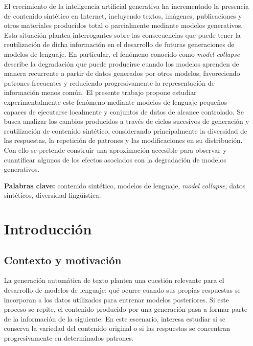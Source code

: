 \documentclass[12pt,letterpaper]{article}
\begin{document}
\vspace{0.5cm}

\justifying

El crecimiento de la inteligencia artificial generativa ha incrementado la
presencia de contenido sintético en Internet, incluyendo textos, imágenes,
publicaciones y otros materiales producidos total o parcialmente mediante
modelos generativos. Esta situación plantea interrogantes sobre las
consecuencias que puede tener la reutilización de dicha información en el
desarrollo de futuras generaciones de modelos de lenguaje. En particular, el
fenómeno conocido como \textit{model collapse} describe la degradación que
puede producirse cuando los modelos aprenden de manera recurrente a partir de
datos generados por otros modelos, favoreciendo patrones frecuentes y
reduciendo progresivamente la representación de información menos común. El
presente trabajo propone estudiar experimentalmente este fenómeno mediante
modelos de lenguaje pequeños capaces de ejecutarse localmente y conjuntos de
datos de alcance controlado. Se busca analizar los cambios producidos a través
de ciclos sucesivos de generación y reutilización de contenido sintético,
considerando principalmente la diversidad de las respuestas, la repetición de
patrones y las modificaciones en su distribución. Con ello se pretende
construir una aproximación accesible para observar y cuantificar algunos de
los efectos asociados con la degradación de modelos generativos.

\vspace{0.7cm}

\noindent
\textbf{Palabras clave:}
contenido sintético,
modelos de lenguaje,
\textit{model collapse},
datos sintéticos,
diversidad lingüística.

\clearpage
{}
\setcounter{page}{1}
\section{Introducción}

\subsection{Contexto y motivación}

La generación automática de texto plantea una cuestión relevante para el
desarrollo de modelos de lenguaje: qué ocurre cuando sus propias respuestas
se incorporan a los datos utilizados para entrenar modelos posteriores.
Si este proceso se repite, el contenido producido por una generación pasa
a formar parte de la información de la siguiente. En este escenario,
interesa estudiar si se conserva la variedad del contenido original o si
las respuestas se concentran progresivamente en determinados patrones.
\end{document}
